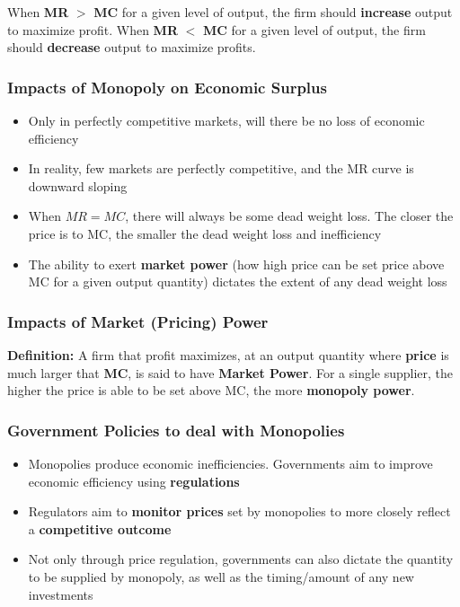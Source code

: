 \vspace{2em}

\noindent When \textbf{MR} $>$ \textbf{MC} for a given level of output, the firm should \textbf{increase} output to maximize profit. When \textbf{MR} $<$ \textbf{MC} for a given level of output, the firm should \textbf{decrease} output to maximize profits.

\subsubsection{Impacts of Monopoly on Economic Surplus}
\begin{itemize}
	\item Only in perfectly competitive markets, will there be no loss of economic efficiency
	\item In reality, few markets are perfectly competitive, and the MR curve is downward sloping
	\item When $MR = MC$, there will always be some dead weight loss. The closer the price is to MC, the smaller the dead weight loss and inefficiency
	\item The ability to exert \textbf{market power} (how high price can be set price above MC for a given output quantity) dictates the extent of any dead weight loss
\end{itemize}

\subsubsection{Impacts of Market (Pricing) Power}
\textbf{Definition:} A firm that profit maximizes, at an output quantity where \textbf{price} is much larger that \textbf{MC}, is said to have \textbf{Market Power}. For a single supplier, the higher the price is able to be set above MC, the more \textbf{monopoly power}.

\subsubsection{Government Policies to deal with Monopolies}
\begin{itemize}
	\item Monopolies produce economic inefficiencies. Governments aim to improve economic efficiency using \textbf{regulations}
	\item Regulators aim to \textbf{monitor prices} set by monopolies to more closely reflect a \textbf{competitive outcome}
	\item Not only through price regulation, governments can also dictate the quantity to be supplied by monopoly, as well as the timing/amount of any new investments
\end{itemize}

